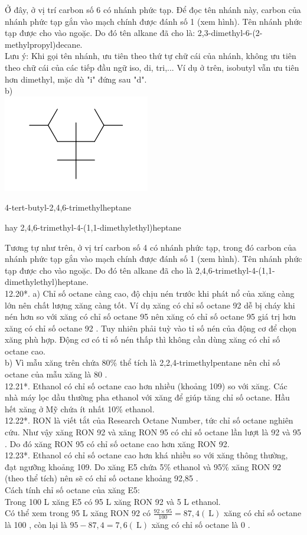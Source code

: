 \documentclass[10pt]{article}
\begin{document}
Ở đây, ở vị trí carbon số 6 có nhánh phức tạp. Để đọc tên nhánh này, carbon của nhánh phức tạp gắn vào mạch chính được đánh số 1 (xem hình). Tên nhánh phức tạp được cho vào ngoặc. Do đó tên alkane đã cho là: 2,3-dimethyl-6-(2-methylpropyl)decane.\\
Lưu ý: Khi gọi tên nhánh, ưu tiên theo thứ tự chữ cái của nhánh, không ưu tiên theo chữ cái của các tiếp đầu ngữ iso, di, tri,... Ví dụ ở trên, isobutyl vẫn ưu tiên hơn dimethyl, mặc dù "i" đứng sau "d".\\
b)\\
\includegraphics{smile-5613ea01d5a813b7cf528d9d04bd652915cea8b6}

4-tert-butyl-2,4,6-trimethylheptane

hay 2,4,6-trimethyl-4-(1,1-dimethylethyl)heptane

Tương tự như trên, ở vị trí carbon số 4 có nhánh phức tạp, trong đó carbon của nhánh phức tạp gắn vào mạch chính được đánh số 1 (xem hình). Tên nhánh phức tạp được cho vào ngoặc. Do đó tên alkane đã cho là 2,4,6-trimethyl-4-(1,1-dimethylethyl)heptane.\\
12.20*. a) Chỉ số octane càng cao, độ chịu nén trước khi phát nổ của xăng càng lớn nên chất lượng xăng càng tốt. Ví dụ xăng có chỉ số octane 92 dễ bị cháy khi nén hơn so với xăng có chỉ số octane 95 nên xăng có chỉ số octane 95 giá trị hơn xăng có chỉ số octane 92 . Tuy nhiên phải tuỳ vào tỉ số nén của động cơ để chọn xăng phù hợp. Động cơ có tỉ số nén thấp thì không cần dùng xăng có chỉ số octane cao.\\
b) Vì mẫu xăng trên chứa $80 \%$ thể tích là 2,2,4-trimethylpentane nên chỉ số octane của mẫu xăng là 80 .\\
12.21*. Ethanol có chỉ số octane cao hơn nhiều (khoảng 109) so với xăng. Các nhà máy lọc dầu thường pha ethanol với xăng để giúp tăng chỉ số octane. Hầu hết xăng ở Mỹ chứa ít nhất 10\% ethanol.\\
12.22*. RON là viết tắt của Research Octane Number, tức chỉ số octane nghiên cứu. Như vậy xăng RON 92 và xăng RON 95 có chỉ số octane lần lượt là 92 và 95 . Do đó xăng RON 95 có chỉ số octane cao hơn xăng RON 92.\\
12.23*. Ethanol có chỉ số octane cao hơn khá nhiều so với xăng thông thường, đạt ngưỡng khoảng 109. Do xăng E5 chứa 5\% ethanol và 95\% xăng RON 92 (theo thể tích) nên sẽ có chỉ số octane khoảng 92,85 .\\
Cách tính chỉ số octane của xăng E5:\\
Trong 100 L xăng E5 có 95 L xăng RON 92 và 5 L ethanol.\\
Có thể xem trong 95 L xăng RON 92 có $\frac{92 \times 95}{100}=87,4(\mathrm{~L})$ xăng có chỉ số octane là 100 , còn lại là $95-87,4=7,6(\mathrm{~L})$ xăng có chỉ số octane là 0 .
\end{document}
